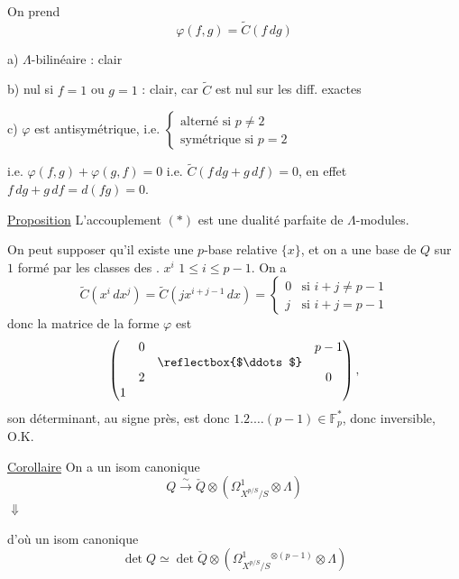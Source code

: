 On prend
\[
 \varphi(f,g)=\widetilde C(f\,dg)
\]

a) $\Lambda$-bilinéaire : clair

b) nul si  $f=1$ ou $g=1$ : clair, car $\widetilde C$ est nul sur les diff. exactes

c) $\varphi$ est antisymétrique, i.e. $\left\{\begin{array}{l}\text{alterné si }p\ne2\\\text{symétrique si }p=2\end{array}\right.$

i.e. $\varphi(f,g)+\varphi(g,f)=0$ i.e. $\widetilde C(f\,dg+g\,df)=0$, en effet $f\,dg+g\,df=d(fg)=0$.

\uline{Proposition} L'accouplement $(\ast)$ est une dualité parfaite de $\Lambda$-modules.

On peut supposer qu'il existe une $p$-base relative $\{x\}$, et on a une base de $Q$ sur $1$ formé par les classes des . $x^i$ $1\le i\le p-1$. On a
\[
 \widetilde C(x^i\,dx^j)=\widetilde C(jx^{i+j-1}\,dx)=
 \begin{cases}0&\text{si }i+j\ne p-1\\j&\text{si }i+j=p-1\end{cases}
\]
donc la matrice de la forme $\varphi$ est
\[
 \begin{pmatrix}
 &0&&p-1\\
 &&\reflectbox{$\ddots$}&\\
 &2&&0\\
 1&&&
 \end{pmatrix},
\]
son déterminant, au signe près, est donc $1.2.\ldots(p-1)\in\mathbb F_p^\ast$,  donc inversible, O.K.

\uline{Corollaire}  On a un isom canonique
\[
 Q\xrightarrow{\sim}\check Q\otimes(\Omega^1_{X^{p/S}/S}\otimes\Lambda)
\]
$\Downarrow$

d'où un isom canonique
\[
 \det Q\simeq\det\check Q\otimes(\Omega^1_{X^{p/S}/S}{}^{\otimes(p-1)}\otimes\Lambda)
\]
